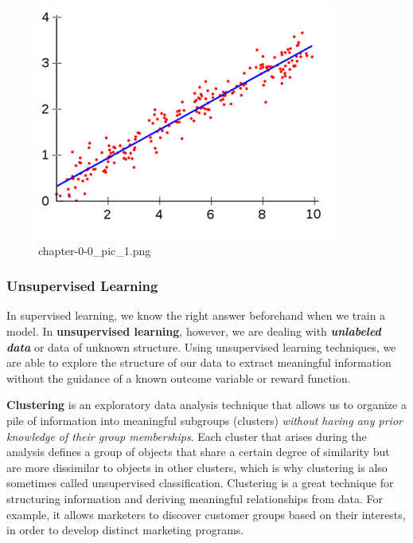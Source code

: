\documentclass[11pt]{article}
\begin{document}
    \begin{figure}
\centering
\includegraphics{./pic/chapter-0-0_pic_1.png}
\caption{chapter-0-0\_pic\_1.png}
\end{figure}

    \hypertarget{unsupervised-learning}{%
\subsubsection{Unsupervised Learning}\label{unsupervised-learning}}

    In supervised learning, we know the right answer beforehand when we
train a model. In \textbf{unsupervised learning}, however, we are
dealing with \textbf{\emph{unlabeled data}} or data of unknown
structure. Using unsupervised learning techniques, we are able to
explore the structure of our data to extract meaningful information
without the guidance of a known outcome variable or reward function.

\textbf{Clustering} is an exploratory data analysis technique that
allows us to organize a pile of information into meaningful subgroups
(clusters) \emph{without having any prior knowledge of their group
memberships}. Each cluster that arises during the analysis defines a
group of objects that share a certain degree of similarity but are more
dissimilar to objects in other clusters, which is why clustering is also
sometimes called unsupervised classification. Clustering is a great
technique for structuring information and deriving meaningful
relationships from data. For example, it allows marketers to discover
customer groups based on their interests, in order to develop distinct
marketing programs.
\end{document}
